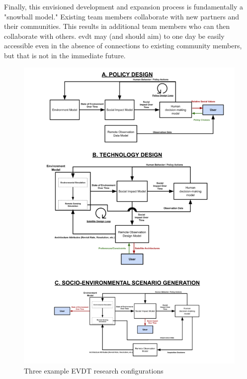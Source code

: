Finally, this envisioned development and expansion process is fundamentally a "snowball model." Existing team members collaborate with new partners and their communities. This results in additional team members who can then collaborate with others. \ac{evdt} may (and should aim) to one day be easily accessible even in the absence of connections to existing community members, but that is not in the immediate future.

\clearpage
\begin{figure}[!htb]
	\centering
	\includegraphics[scale=0.5]{Figures/chap3/Loops_Combined.png}
	\caption{Three example EVDT research configurations}
	\label{fig:combo}
\end{figure}
\clearpage









